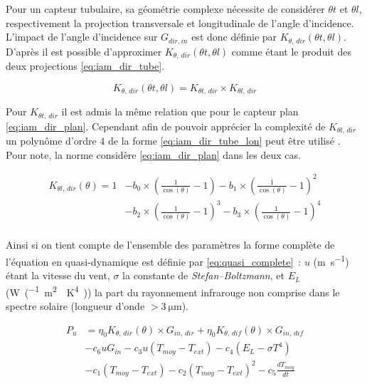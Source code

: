 Pour un capteur tubulaire, sa géométrie complexe nécessite de considérer $\theta t$ et
$\theta l$, respectivement la projection transversale et longitudinale de l’angle
d’incidence. L’impact de l’angle d’incidence sur $G_{dir, in}$ est donc définie par
$K_{\theta,\,dir} (\theta t, \theta l)$. D’après \textcite{McIntire1982315} il est possible
d’approximer $K_{\theta,\,dir} (\theta t, \theta l)$ comme étant le produit des deux
projections \eqref{eq:iam_dir_tube}.

\begin{equation}\label{eq:iam_dir_tube}
    K_{\theta,\,dir} (\theta t, \theta l) = K_{\theta t,\,dir} \times K_{\theta l,\,dir}
\end{equation}

Pour $K_{\theta t,\,dir}$ il est admis la même relation que pour le capteur plan \eqref{eq:iam_dir_plan}.
Cependant afin de pouvoir apprécier la complexité de $K_{\theta l,\,dir}$ un polynôme d’ordre
$4$ de la forme \eqref{eq:iam_dir_tube_lon} peut être utilisé \parencite{Zambolin201237}.
Pour note, la norme considère \eqref{eq:iam_dir_plan} dans les deux cas.

\begin{align}\label{eq:iam_dir_tube_lon}
    K_{\theta l,\,dir} (\theta) = 1 &- b_{0} \times \left(\frac{1}{\cos(\theta)} - 1\right)
                          - b_{1} \times \left(\frac{1}{\cos(\theta)} - 1\right)^{2} \\
                          &- b_{2} \times \left(\frac{1}{\cos(\theta)} - 1\right)^{3}
                          - b_{3} \times \left(\frac{1}{\cos(\theta)} - 1\right)^{4} \\
\end{align}

Ainsi si on tient compte de l’ensemble des paramètres la forme complète de l’équation
en quasi-dynamique est définie par \eqref{eq:quasi_complete}~: $u$ (\si{\metre\per\second})
étant la vitesse du vent, $\sigma$ la constante de \textit{Stefan–Boltzmann}, et $E_{L}$
(\si{W\per(\metre\squared\period\kelvin^{4})}) la part du rayonnement infrarouge
non comprise dans le spectre solaire (longueur d’onde $> \SI{3}{\micro\metre}$).


\begin{align}\label{eq:quasi_complete}
        P_{u}  &= \eta_{0} K_{\theta,\,dir}(\theta) \times G_{in,\,dir} +
                  \eta_{0} K_{\theta,\,dif}(\theta) \times G_{in,\,dif} \\
                &- c_{6}uG_{in} - c_{3} u(T_{moy} - T_{ext}) - c_{4} (E_{L} - \sigma T^{4}) \\
                &- c_{1} (T_{moy} - T_{ext}) - c_{2} (T_{moy} - T_{ext})^{2} - c_{5}\frac{dT_{moy}}{dt}
\end{align}


